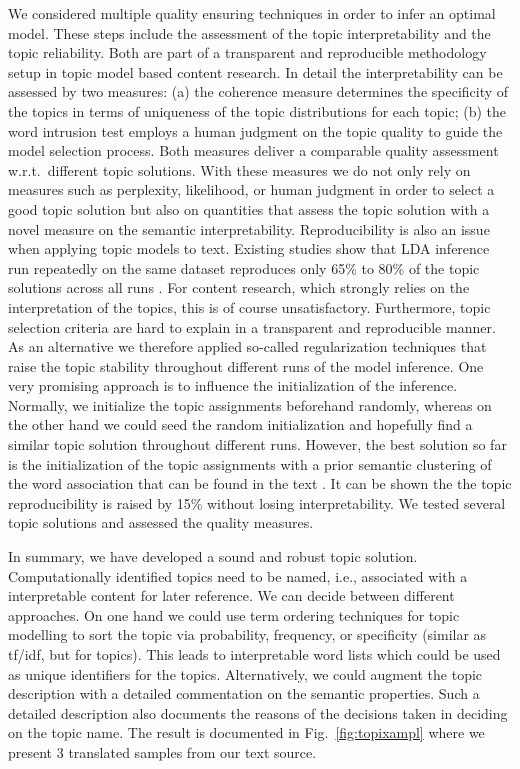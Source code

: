 \documentclass[a4paper,10pt]{article}
\begin{document}
We considered multiple quality ensuring techniques in order to infer an
optimal model. These steps include the assessment of the topic
interpretability and the topic reliability. Both are part of a transparent
and reproducible methodology setup in topic model based content research.
In detail the interpretability can be assessed by two measures: (a) the
coherence measure \cite{newman:2010} determines the specificity of the
topics in terms of uniqueness of the topic distributions for each topic;
(b) the word intrusion test \cite{chang:2009} employs a human judgment on
the topic quality to guide the model selection process. Both measures
deliver a comparable quality assessment w.r.t.\ different topic
solutions. With these measures we do not only rely on measures such as
perplexity, likelihood, or human judgment in order to select a good topic
solution but also on quantities that assess the topic solution with a novel
measure on the semantic interpretability. Reproducibility is also an issue
when applying topic models to text. Existing studies show that LDA
inference run repeatedly on the same dataset reproduces only 65\% to 80\%
of the topic solutions across all runs \cite{niekler:2012,koltcov:2016}.
For content research, which strongly relies on the interpretation of the
topics, this is of course unsatisfactory. Furthermore, topic selection
criteria are hard to explain in a transparent and reproducible manner. As
an alternative we therefore applied so-called regularization techniques
that raise the topic stability throughout different runs of the model
inference. One very promising approach is to influence the initialization
of the inference. Normally, we initialize the topic assignments beforehand
randomly, whereas on the other hand we could seed the random initialization
and hopefully find a similar topic solution throughout different
runs. However, the best solution so far is the initialization of the topic
assignments with a prior semantic clustering of the word association that
can be found in the text \cite{lancichinetti:2015}. It can be shown the the
topic reproducibility is raised by 15\% without losing interpretability. We
tested several topic solutions and assessed the quality measures.

In summary, we have developed a sound and robust topic solution.
  Computationally identified topics need to be named, i.e., associated with
  a interpretable content for later reference.  We can decide between
different approaches. On one hand we could use term ordering techniques for
topic modelling to sort the topic via probability, frequency, or
specificity (similar as tf/idf, but for topics). This leads to
interpretable word lists which could be used as unique identifiers for the
topics. Alternatively, we could augment the topic description with a
detailed commentation on the semantic properties. Such a detailed
  description also documents the reasons of the decisions taken in deciding
  on the topic name. The result is documented in Fig.~\ref{fig:topixampl}
where we present 3 translated samples from our text source.
\end{document}
